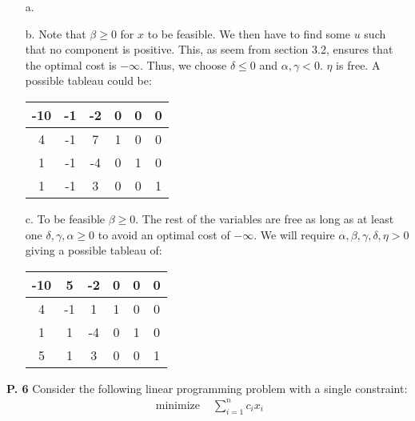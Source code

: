 \documentclass{article}
\begin{document}
\begin{jacklist}
    \begin{itemize}
        \item [a.]  
        \item [b.] Note that $\beta \geq 0$ for $x$ to be feasible. We then have to find some $u$ such that no component is positive. 
            This, as seem from section 3.2, ensures that the optimal cost is $-\infty$. Thus, we choose $\delta \leq 0$ and 
            $\alpha, \gamma < 0$. $\eta$ is free. A possible tableau could be: 
            \begin{center}
                \begin{tabular}{|c|ccccc|}
                    \hline
                    -10&-1&-2&0&0&0\\
                    \hline
                    4&-1&7&1&0&0\\
                    1&-1&-4&0&1&0\\
                    1&-1&3&0&0&1\\
                    \hline
                \end{tabular}
            \end{center}    
        \item [c.] To be feasible $\beta \geq 0$. The rest of the variables are free as long as at least one 
            $\delta, \gamma, \alpha \geq 0$ to avoid an optimal cost of $-\infty$. We will require $\alpha, \beta, \gamma, \delta, 
            \eta > 0$ giving a possible tableau of:
            \begin{center}
                \begin{tabular}{|c|ccccc|}
                    \hline
                    -10&5&-2&0&0&0\\
                    \hline
                    4&-1&1&1&0&0\\
                    1&1&-4&0&1&0\\
                    5&1&3&0&0&1\\
                    \hline
                \end{tabular}
            \end{center}
    \end{itemize}
\newpage
    \begin{framed} 
    \item [\textbf{P. 6}] Consider the following linear programming problem with a single constraint: 
    \[ 
        \begin{aligned}
            \text { minimize } & \sum_{i=1}^{n} c_{i} x_{i} \\

\end{aligned}\]
\end{framed}
\end{jacklist}
\end{document}

